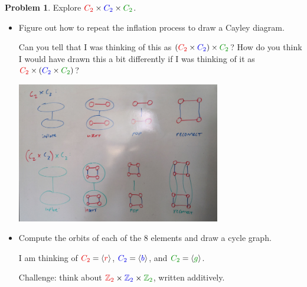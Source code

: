 \documentclass[12pt]{article}
\theoremstyle{definition} %
\newtheorem{problem}{Problem}
\newcommand{\Alert}[1]{\textcolor{xRed}{#1}}
\newcommand{\Balert}[1]{\textcolor{xBlue}{#1}}
\newcommand{\Galert}[1]{\textcolor{xGreen}{#1}}
\newcommand{\Z}{\mathbb{Z}}
\def\<{\langle}
\def\>{\rangle}
\newenvironment{red}{\color{red}}{\ignorespacesafterend}
\begin{document}
\begin{problem}
    Explore $\Alert{C_2} \times \Balert{C_2} \times \Galert{C_2}$.
    \begin{itemize}
        \item Figure out how to repeat the inflation process to draw a Cayley diagram.

        \begin{red}
            Can you tell that I was thinking of this as $(\Alert{C_2} \times \Balert{C_2}) \times \Galert{C_2}$? How do you think I would have drawn this a bit differently if I was thinking of it as $\Alert{C_2} \times (\Balert{C_2} \times \Galert{C_2})$?
        \end{red}

        \includegraphics[width=0.7\textwidth]{../images/c2c2c2-inflation.png}
        \item Compute the orbits of each of the 8 elements and draw a cycle graph.

        I am thinking of $\Alert{C_2} = \<\Alert{r}\>$,  $\Balert{C_2} = \<\Balert{b}\>$, and $\Galert{C_2} = \<\Galert{g}\>$. 
        
        Challenge: think about $\Alert{\Z_2} \times \Balert{\Z_2} \times \Galert{\Z_2}$, written additively.


\end{itemize}
\end{problem}
\end{document}
